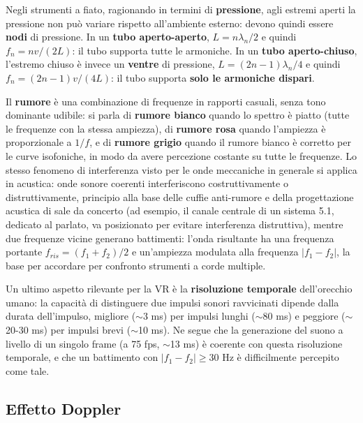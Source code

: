 \documentclass[a4paper,11pt]{article}
\begin{document}
Negli strumenti a fiato, ragionando in termini di \textbf{pressione}, agli estremi aperti la pressione non può variare rispetto all'ambiente esterno: devono quindi essere \textbf{nodi} di pressione. In un \textbf{tubo aperto-aperto}, $L=n\lambda_n/2$ e quindi $f_n=nv/(2L)$: il tubo supporta tutte le armoniche. In un \textbf{tubo aperto-chiuso}, l'estremo chiuso è invece un \textbf{ventre} di pressione, $L=(2n-1)\lambda_n/4$ e quindi $f_n=(2n-1)v/(4L)$: il tubo supporta \textbf{solo le armoniche dispari}.

Il \textbf{rumore} è una combinazione di frequenze in rapporti casuali, senza tono dominante udibile: si parla di \textbf{rumore bianco} quando lo spettro è piatto (tutte le frequenze con la stessa ampiezza), di \textbf{rumore rosa} quando l'ampiezza è proporzionale a $1/f$, e di \textbf{rumore grigio} quando il rumore bianco è corretto per le curve isofoniche, in modo da avere percezione costante su tutte le frequenze. Lo stesso fenomeno di interferenza visto per le onde meccaniche in generale si applica in acustica: onde sonore coerenti interferiscono costruttivamente o distruttivamente, principio alla base delle cuffie anti-rumore e della progettazione acustica di sale da concerto (ad esempio, il canale centrale di un sistema 5.1, dedicato al parlato, va posizionato per evitare interferenza distruttiva), mentre due frequenze vicine generano battimenti: l'onda risultante ha una frequenza portante $f_{ris}=(f_1+f_2)/2$ e un'ampiezza modulata alla frequenza $|f_1-f_2|$, la base per accordare per confronto strumenti a corde multiple.

Un ultimo aspetto rilevante per la VR è la \textbf{risoluzione temporale} dell'orecchio umano: la capacità di distinguere due impulsi sonori ravvicinati dipende dalla durata dell'impulso, migliore ($\sim$3 ms) per impulsi lunghi ($\sim$80 ms) e peggiore ($\sim$20-30 ms) per impulsi brevi ($\sim$10 ms). Ne segue che la generazione del suono a livello di un singolo frame (a 75 fps, $\sim$13 ms) è coerente con questa risoluzione temporale, e che un battimento con $|f_1-f_2|\geq30$ Hz è difficilmente percepito come tale.

\subsection{Effetto Doppler}
\end{document}
